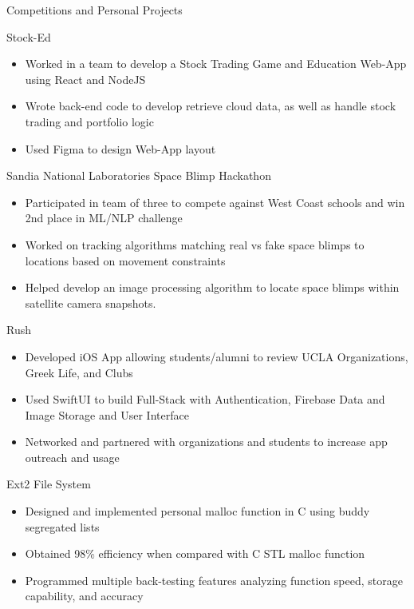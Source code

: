 \documentclass{article}
\newlength{\tabin}
\newlength{\secsep}
\newcommand{\lineunder}{\vspace*{-8pt} \\ \hspace*{-6pt} \hrulefill \\ \vspace*{-15pt}}
\newenvironment{tabbedsection}[1]{
  \begin{list}{}{
      \setlength{\itemsep}{0pt}
      \setlength{\labelsep}{0pt}
      \setlength{\labelwidth}{0pt}
      \setlength{\leftmargin}{\tabin}
      \setlength{\rightmargin}{\tabin}
      \setlength{\listparindent}{0pt}
      \setlength{\parsep}{0pt}
      \setlength{\parskip}{0pt}
      \setlength{\partopsep}{0pt}
      \setlength{\topsep}{#1}
    }
  \item[]
}{\end{list}}
\newenvironment{resume_section}[1]{
  \filbreak
  \vspace{2\secsep}
  \textsc{\large#1}
  \lineunder
  \begin{tabbedsection}{\secsep}
}{\end{tabbedsection}}
\newenvironment{resume_subsection}[2][]{
  \textbf{#2} \hfill{\footnotesize #1} \par
  \begin{tabbedsection}{0.5\secsep}
}{\end{tabbedsection}}
\newenvironment{subitems}{
  \renewcommand{\labelitemi}{-}
  \begin{itemize}
      \setlength{\labelsep}{1em}
}{\end{itemize}}
\begin{document}
\begin{resume_section}{Competitions and Personal Projects}
  \begin{resume_subsection}[(May 2021)]{Stock-Ed}
  \begin{subitems}
    \item Worked in a team to develop a Stock Trading Game and Education Web-App using React and NodeJS
    \item Wrote back-end code to develop retrieve cloud data, as well as handle stock trading and portfolio logic
    \item Used Figma to design Web-App layout
    \end{subitems}
  \end{resume_subsection}

  \begin{resume_subsection}[(April 2021)]{Sandia National Laboratories Space Blimp Hackathon}
  \begin{subitems}
    \item Participated in team of three to compete against West Coast schools and win 2nd place in ML/NLP challenge
    \item Worked on tracking algorithms matching real vs fake space blimps to locations based on movement constraints
    \item Helped develop an image processing algorithm to locate space blimps within satellite camera snapshots.
    \end{subitems}
  \end{resume_subsection}

  \begin{resume_subsection}[(November 2020)]{Rush}
  \begin{subitems}
    \item Developed iOS App allowing students/alumni to review UCLA Organizations, Greek Life, and Clubs
    \item Used SwiftUI to build Full-Stack with Authentication, Firebase Data and Image Storage and User Interface
    \item Networked and partnered with organizations and students to increase app outreach and usage
    \end{subitems}
  \end{resume_subsection}

  \begin{resume_subsection}[(August 2020)]{Ext2 File System}
    \begin{subitems}
        \item Designed and implemented personal malloc function in C using buddy segregated lists
        \item Obtained 98\% efficiency when compared with C STL malloc function
        \item Programmed multiple back-testing features analyzing function speed, storage capability, and accuracy
    \end{subitems}
  \end{resume_subsection}
  \end{resume_section}
\end{document}
